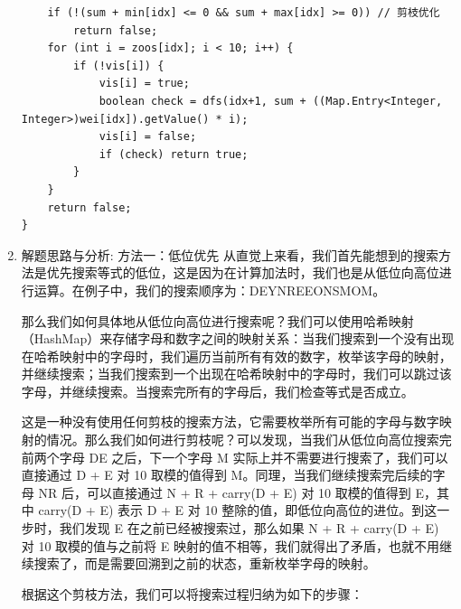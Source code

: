\documentclass[9pt, b5paaper]{book}
\begin{document}
\begin{enumerate}
\begin{verbatim}
    if (!(sum + min[idx] <= 0 && sum + max[idx] >= 0)) // 剪枝优化
        return false;
    for (int i = zoos[idx]; i < 10; i++) {
        if (!vis[i]) {
            vis[i] = true;
            boolean check = dfs(idx+1, sum + ((Map.Entry<Integer, Integer>)wei[idx]).getValue() * i);
            vis[i] = false;
            if (check) return true;
        }
    }
    return false;
}
\end{verbatim}
\item 解题思路与分析: 方法一：低位优先
\label{sec-8-0-3-3}
从直觉上来看，我们首先能想到的搜索方法是优先搜索等式的低位，这是因为在计算加法时，我们也是从低位向高位进行运算。在例子中，我们的搜索顺序为：DEYNREEONSMOM。

那么我们如何具体地从低位向高位进行搜索呢？我们可以使用哈希映射（HashMap）来存储字母和数字之间的映射关系：当我们搜索到一个没有出现在哈希映射中的字母时，我们遍历当前所有有效的数字，枚举该字母的映射，并继续搜索；当我们搜索到一个出现在哈希映射中的字母时，我们可以跳过该字母，并继续搜索。当搜索完所有的字母后，我们检查等式是否成立。

这是一种没有使用任何剪枝的搜索方法，它需要枚举所有可能的字母与数字映射的情况。那么我们如何进行剪枝呢？可以发现，当我们从低位向高位搜索完前两个字母 DE 之后，下一个字母 M 实际上并不需要进行搜索了，我们可以直接通过 D + E 对 10 取模的值得到 M。同理，当我们继续搜索完后续的字母 NR 后，可以直接通过 N + R + carry(D + E) 对 10 取模的值得到 E，其中 carry(D + E) 表示 D + E 对 10 整除的值，即低位向高位的进位。到这一步时，我们发现 E 在之前已经被搜索过，那么如果 N + R + carry(D + E) 对 10 取模的值与之前将 E 映射的值不相等，我们就得出了矛盾，也就不用继续搜索了，而是需要回溯到之前的状态，重新枚举字母的映射。

根据这个剪枝方法，我们可以将搜索过程归纳为如下的步骤：


\end{enumerate}
\end{document}
